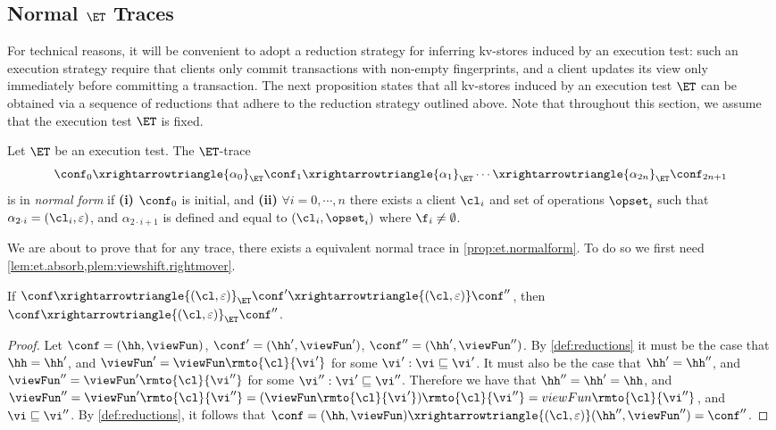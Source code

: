 \subsection{Normal \( \ET \) Traces}
\label{sec:normal-form-exist}
For technical reasons, it will be convenient to adopt a reduction strategy for inferring kv-stores induced by an 
execution test: such an execution strategy require that clients only commit transactions with non-empty fingerprints, 
and a client updates its view only immediately before committing a transaction. 
The next proposition states that all kv-stores induced by an execution test $\ET$ can be 
obtained via a sequence of reductions that adhere to the reduction strategy outlined above. 
Note that throughout this section, we assume that the execution test $\ET$ is fixed.
\begin{definition}
Let $\ET$ be an execution test. The $\ET$-trace
\[
\conf_0 \xrightarrowtriangle{\alpha_0}_{\ET} \conf_1 \xrightarrowtriangle{\alpha_1}_{\ET} \cdots \xrightarrowtriangle{\alpha_{2n}}_{\ET} \conf_{2n + 1}
\]
is in \emph{normal form} if \textbf{(i)} $\conf_0$ is initial, and 
\textbf{(ii)} $\forall i=0,\cdots, n$ there exists a client $\cl_i$ and set of operations $\opset_{i}$ such that 
$\alpha_{2 \cdot i} = (\cl_{i}, \varepsilon)$, and $\alpha_{2 \cdot i + 1}$ is defined and equal to $(\cl_{i}, \opset_{i})$ where \( \f_i \neq \emptyset \).
\end{definition}

We are about to prove that for any trace, there exists a equivalent normal trace in \cref{prop:et.normalform}.
To do so we first need \cref{lem:et.absorb,plem:viewshift.rightmover}.

\sx{!!!!!!!!!!!!!!}

\begin{lemma}[Absorption]
\label{lem:et.absorb}
If $\conf \xrightarrowtriangle{(\cl, \varepsilon)}_{\ET} \conf' \xrightarrowtriangle{(\cl, \varepsilon)} \conf''$, then 
$\conf \xrightarrowtriangle{(\cl, \varepsilon)}_{\ET} \conf''$.
\end{lemma}

\begin{proof}
Let $\conf = (\hh, \viewFun)$, $\conf' = (\hh', \viewFun')$, $\conf'' = (\hh', \viewFun'')$. 
By \cref{def:reductions} it must be the case that $\hh = \hh'$, and $\viewFun' = \viewFun\rmto{\cl}{\vi'}$ 
for some $\vi' : \vi \sqsubseteq \vi'$. It must also be the case that $\hh' = \hh''$, and $\viewFun'' = \viewFun'\rmto{\cl}{\vi''}$ 
for some $\vi'': \vi' \sqsubseteq \vi''$. Therefore we have that $\hh'' = \hh' = \hh$, and 
$\viewFun'' = \viewFun'\rmto{\cl}{\vi''} = (\viewFun\rmto{\cl}{\vi'})\rmto{\cl}{\vi''} = viewFun\rmto{\cl}{\vi''}$, 
and $\vi \sqsubseteq \vi''$. By \cref{def:reductions}, it follows that 
$\conf = (\hh, \viewFun) \xrightarrowtriangle{(\cl, \varepsilon)} (\hh'', \viewFun'') = \conf''$.
\end{proof}

